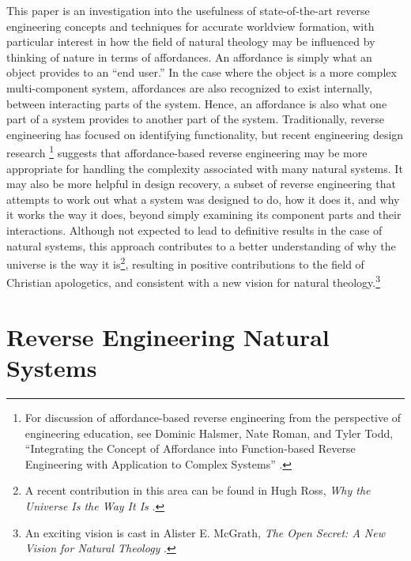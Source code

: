 This paper is an investigation into the usefulness of state-of-the-art
reverse engineering concepts and techniques for accurate worldview
formation, with particular interest in how the field of natural
theology may be influenced by thinking of nature in terms of
affordances. An affordance is simply what an object provides to an ``end
user.'' In the case where the object is a more complex multi-component
system, affordances are also recognized to exist internally, between
interacting parts of the system. Hence, an affordance is also what one
part of a system provides to another part of the system. Traditionally,
reverse engineering has focused on identifying functionality, but
recent engineering design research \citep[][pp. 34--37]{maier2008}\footnote{
For
discussion of affordance-based reverse engineering from the perspective
of engineering education, see Dominic Halsmer, Nate Roman, and Tyler
Todd, “Integrating the Concept of Affordance into Function-based
Reverse Engineering with Application to Complex Systems” \citep{halsmeretal2009}.
} suggests that
affordance-based reverse engineering may be more appropriate for
handling the complexity associated with many natural systems. It may
also be more helpful in design recovery, a subset of reverse
engineering that attempts to work out what a system was designed to do,
how it does it, and why it works the way it does, beyond simply
examining its component parts and their interactions. Although not
expected to lead to definitive results in the case of natural systems,
this approach contributes to a better understanding of why the universe
is the way it is\footnote{
A recent contribution in this area can be found in
Hugh Ross, \textit{Why the Universe Is the Way It Is} \citep{ross2008}.
}, resulting in positive
contributions to the field of Christian apologetics, and consistent
with a new vision for natural theology.\footnote{
An exciting vision is cast in Alister E. McGrath,
\textit{The Open Secret: A New Vision for Natural Theology} \citep{mcgrath2008}.
}

\section{Reverse Engineering Natural Systems}

